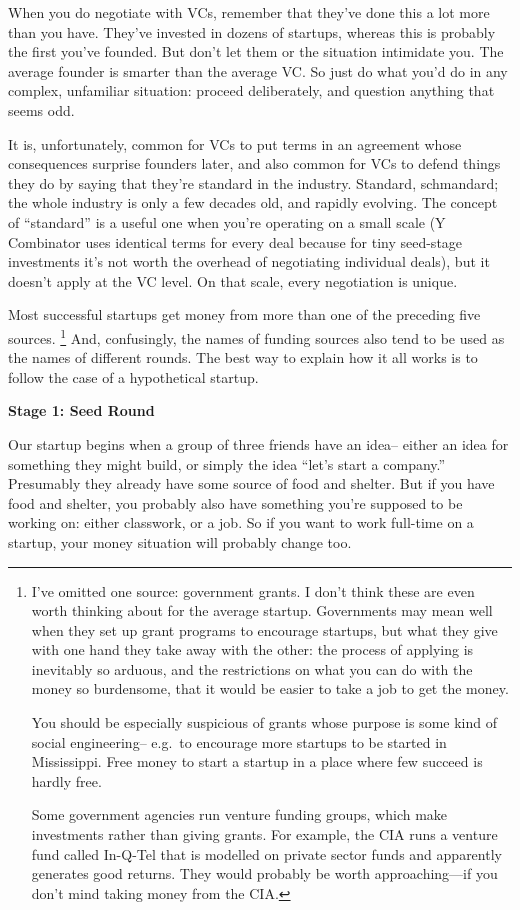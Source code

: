 When you do negotiate with VCs, remember that they've done this a lot
more than you have. They've invested in dozens of startups, whereas this
is probably the first you've founded. But don't let them or the
situation intimidate you. The average founder is smarter than the
average VC. So just do what you'd do in any complex, unfamiliar
situation: proceed deliberately, and question anything that seems odd.

It is, unfortunately, common for VCs to put terms in an agreement whose
consequences surprise founders later, and also common for VCs to defend
things they do by saying that they're standard in the industry.
Standard, schmandard; the whole industry is only a few decades old, and
rapidly evolving. The concept of ``standard'' is a useful one when
you're operating on a small scale (Y Combinator uses identical terms for
every deal because for tiny seed-stage investments it's not worth the
overhead of negotiating individual deals), but it doesn't apply at the
VC level. On that scale, every negotiation is unique.

Most successful startups get money from more than one of the preceding
five sources. \footnote{I've omitted one source: government grants. I don't think these
are even worth thinking about for the average startup. Governments may
mean well when they set up grant programs to encourage startups, but
what they give with one hand they take away with the other: the process
of applying is inevitably so arduous, and the restrictions on what you
can do with the money so burdensome, that it would be easier to take a
job to get the money.

You should be especially suspicious of grants whose purpose is some kind
of social engineering-- e.g.~to encourage more startups to be started in
Mississippi. Free money to start a startup in a place where few succeed
is hardly free.

Some government agencies run venture funding groups, which make
investments rather than giving grants. For example, the CIA runs a
venture fund called In-Q-Tel that is modelled on private sector funds
and apparently generates good returns. They would probably be worth
approaching---if you don't mind taking money from the CIA.} And, confusingly, the names of
funding sources also tend to be used as the names of different rounds.
The best way to explain how it all works is to follow the case of a
hypothetical startup.

\textbf{Stage 1: Seed Round}

Our startup begins when a group of three friends have an idea-- either
an idea for something they might build, or simply the idea ``let's start
a company.'' Presumably they already have some source of food and
shelter. But if you have food and shelter, you probably also have
something you're supposed to be working on: either classwork, or a job.
So if you want to work full-time on a startup, your money situation will
probably change too.

